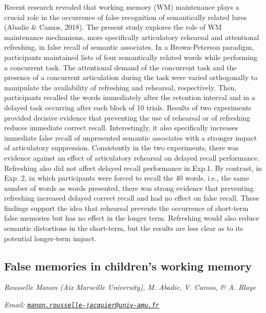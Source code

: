 \documentclass[
  12pt,
]{book}
\begin{document}
Recent research revealed that working memory (WM) maintenance plays a crucial role in the occurrence of false recognition of semantically related lures (Abadie \& Camos, 2018). The present study explores the role of WM maintenance mechanisms, more specifically articulatory rehearsal and attentional refreshing, in false recall of semantic associates. In a Brown-Peterson paradigm, participants maintained lists of four semantically related words while performing a concurrent task. The attentional demand of the concurrent task and the presence of a concurrent articulation during the task were varied orthogonally to manipulate the availability of refreshing and rehearsal, respectively. Then, participants recalled the words immediately after the retention interval and in a delayed task occurring after each block of 10 trials. Results of two experiments provided decisive evidence that preventing the use of rehearsal or of refreshing reduces immediate correct recall. Interestingly, it also specifically increases immediate false recall of unpresented semantic associates with a stronger impact of articulatory suppression. Consistently in the two experiments, there was evidence against an effect of articulatory rehearsal on delayed recall performance. Refreshing also did not affect delayed recall performance in Exp.1. By contrast, in Exp. 2, in which participants were forced to recall the 40 words, i.e., the same number of words as words presented, there was strong evidence that preventing refreshing increased delayed correct recall and had no effect on false recall. These findings support the idea that rehearsal prevents the occurrence of short-term false memories but has no effect in the longer term. Refreshing would also reduce semantic distortions in the short-term, but the results are less clear as to its potential longer-term impact.

\hypertarget{false-memories-in-childrens-working-memory}{%
\subsection{False memories in children's working memory}\label{false-memories-in-childrens-working-memory}}

\emph{Rousselle Manon (Aix Marseille University), M. Abadie, V. Camos, \& A. Blaye}

\emph{Email: \href{mailto:manon.rousselle-jacquier@univ-amu.fr}{\nolinkurl{manon.rousselle-jacquier@univ-amu.fr}}}
\end{document}

